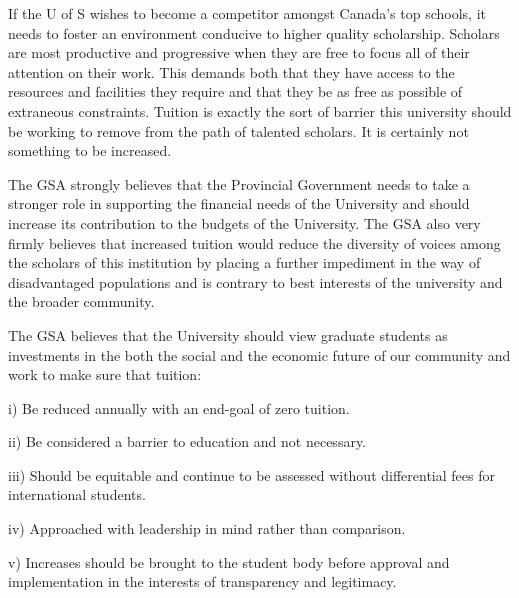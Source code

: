  If the U of S wishes to become a competitor amongst Canada’s top schools, it needs to 
 foster an environment conducive to higher quality scholarship. Scholars are most 
 productive and progressive when they are free to focus all of their attention on their work. 
 This demands both that they have access to the resources and facilities they require and that they be as free as possible of extraneous constraints. Tuition is exactly the sort of 
 barrier this university should be working to remove from the path of talented scholars. It 
 is certainly not something to be increased. 
 
 The GSA strongly believes that the Provincial Government needs to take a stronger role 
 in supporting the financial needs of the University and should increase its contribution to 
 the budgets of the University. The GSA also very firmly believes that increased tuition 
 would reduce the diversity of voices among the scholars of this institution by placing a 
 further impediment in the way of disadvantaged populations and is contrary to best 
 interests of the university and the broader community. 
 
 
 
 The GSA believes that the University should view graduate students as investments in the 
 both the social and the economic future of our community and work to make sure that 
 tuition: 
 
 i) Be reduced annually with an end-goal of zero tuition. 
 
 ii) Be considered a barrier to education and not necessary. 
 
 iii) Should be equitable and continue to be assessed without differential fees 
 for international students. 
 
 iv) Approached with leadership in mind rather than comparison. 
 
 v) Increases should be brought to the student body before approval and 
 implementation in the interests of transparency and legitimacy.